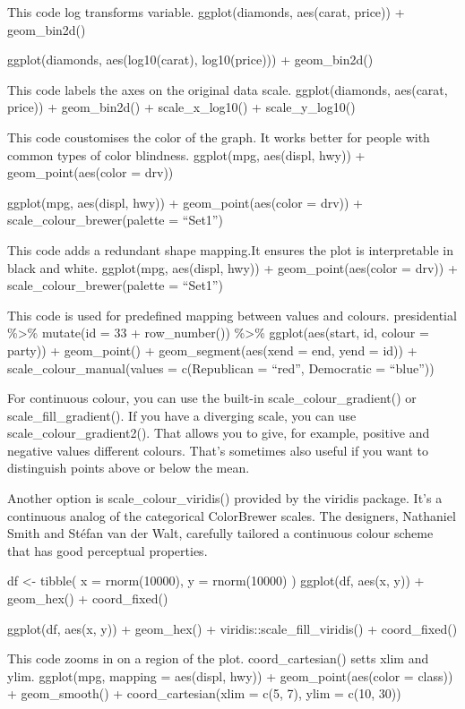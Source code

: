 \documentclass[
]{article}
\begin{document}
This code log transforms variable. ggplot(diamonds, aes(carat, price)) +
geom\_bin2d()

ggplot(diamonds, aes(log10(carat), log10(price))) + geom\_bin2d()

This code labels the axes on the original data scale. ggplot(diamonds,
aes(carat, price)) + geom\_bin2d() + scale\_x\_log10() +
scale\_y\_log10()

This code coustomises the color of the graph. It works better for people
with common types of color blindness. ggplot(mpg, aes(displ, hwy)) +
geom\_point(aes(color = drv))

ggplot(mpg, aes(displ, hwy)) + geom\_point(aes(color = drv)) +
scale\_colour\_brewer(palette = ``Set1'')

This code adds a redundant shape mapping.It ensures the plot is
interpretable in black and white. ggplot(mpg, aes(displ, hwy)) +
geom\_point(aes(color = drv)) + scale\_colour\_brewer(palette =
``Set1'')

This code is used for predefined mapping between values and colours.
presidential \%\textgreater\% mutate(id = 33 + row\_number())
\%\textgreater\% ggplot(aes(start, id, colour = party)) + geom\_point()
+ geom\_segment(aes(xend = end, yend = id)) +
scale\_colour\_manual(values = c(Republican = ``red'', Democratic =
``blue''))

For continuous colour, you can use the built-in
scale\_colour\_gradient() or scale\_fill\_gradient(). If you have a
diverging scale, you can use scale\_colour\_gradient2(). That allows you
to give, for example, positive and negative values different colours.
That's sometimes also useful if you want to distinguish points above or
below the mean.

Another option is scale\_colour\_viridis() provided by the viridis
package. It's a continuous analog of the categorical ColorBrewer scales.
The designers, Nathaniel Smith and Stéfan van der Walt, carefully
tailored a continuous colour scheme that has good perceptual properties.

df \textless- tibble( x = rnorm(10000), y = rnorm(10000) ) ggplot(df,
aes(x, y)) + geom\_hex() + coord\_fixed()

ggplot(df, aes(x, y)) + geom\_hex() + viridis::scale\_fill\_viridis() +
coord\_fixed()

This code zooms in on a region of the plot. coord\_cartesian() setts
xlim and ylim. ggplot(mpg, mapping = aes(displ, hwy)) +
geom\_point(aes(color = class)) + geom\_smooth() + coord\_cartesian(xlim
= c(5, 7), ylim = c(10, 30))
\end{document}
